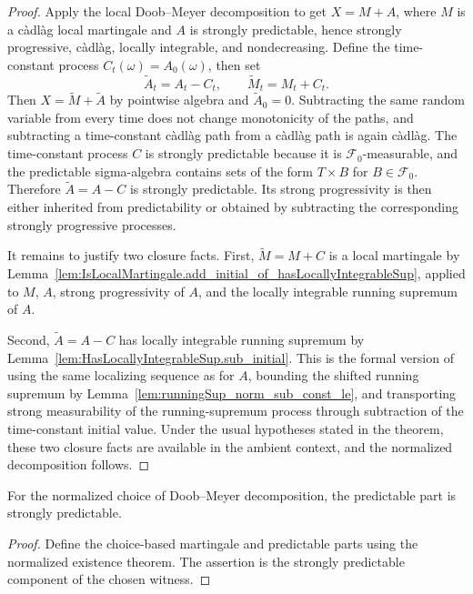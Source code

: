 \begin{proof}

\leanok
Apply the local Doob--Meyer decomposition to get \(X=M+A\), where \(M\)
is a càdlàg local martingale and \(A\) is strongly predictable, hence
strongly progressive, càdlàg, locally integrable, and nondecreasing.
Define the time-constant process \(C_t(\omega)=A_0(\omega)\), then set
\[
  \widetilde A_t=A_t-C_t,
  \qquad
  \widetilde M_t=M_t+C_t .
\]
Then \(X=\widetilde M+\widetilde A\) by pointwise algebra and
\(\widetilde A_0=0\).  Subtracting the same random variable from every
time does not change monotonicity of the paths, and subtracting a
time-constant càdlàg path from a càdlàg path is again càdlàg.  The
time-constant process \(C\) is strongly predictable because it is
\(\mathcal F_0\)-measurable, and the predictable sigma-algebra contains
sets of the form \(T\times B\) for \(B\in\mathcal F_0\).  Therefore
\(\widetilde A=A-C\) is strongly predictable.  Its strong progressivity is
then either inherited from predictability or obtained by subtracting the
corresponding strongly progressive processes.

It remains to justify two closure facts.  First, \(\widetilde M=M+C\) is a
local martingale by
Lemma~\ref{lem:IsLocalMartingale.add_initial_of_hasLocallyIntegrableSup},
applied to \(M\), \(A\), strong progressivity of \(A\), and the locally
integrable running supremum of \(A\).

Second, \(\widetilde A=A-C\) has locally integrable running supremum by
Lemma~\ref{lem:HasLocallyIntegrableSup.sub_initial}.  This is the
formal version of using the same localizing sequence as for \(A\), bounding
the shifted running supremum by
Lemma~\ref{lem:runningSup_norm_sub_const_le}, and transporting strong
measurability of the running-supremum process through subtraction of the
time-constant initial value.  Under the usual hypotheses stated in the
theorem, these two closure facts are available in the ambient context, and
the normalized decomposition follows.
\end{proof}


\begin{lemma}\label{lem:isStronglyPredictable_predictablePart}
  \leanok
For the normalized choice of Doob--Meyer decomposition, the predictable
part is strongly predictable.
\end{lemma}

\begin{proof}

\leanok
Define the choice-based martingale and predictable parts using the
normalized existence theorem.  The assertion is the strongly predictable
component of the chosen witness.
\end{proof}


